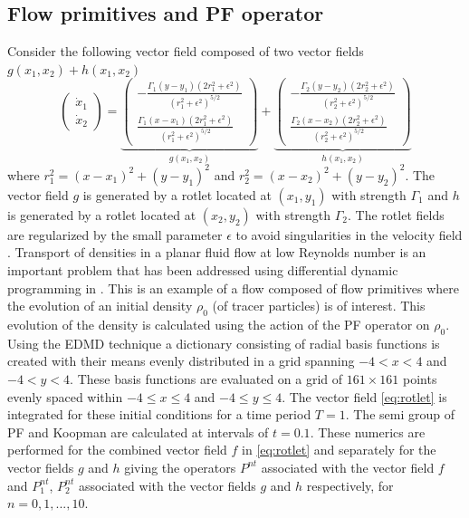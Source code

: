 \documentclass[pdflatex,sn-mathphys]{sn-jnl}%
\theoremstyle{thmstyleone}%
\theoremstyle{thmstyletwo}%
\theoremstyle{thmstylethree}%
\begin{document}
\subsection{Flow primitives and PF operator} \label{sec:rotlet}
Consider the following vector field composed of two vector fields $g(x_1,x_2) + h(x_1,x_2)$
\begin{equation}\label{eq:rotlet}
\begin{pmatrix}
    \dot{x}_1 \\
    \dot{x}_2
\end{pmatrix} 
= \underbrace{\begin{pmatrix}
- \frac{\Gamma_1 (y-y_1)(2r_1^2 + \epsilon^2)}{(r_1^2 + \epsilon^2)^{5/2}}\\
  \frac{\Gamma_1 (x-x_1)(2r_1^2 + \epsilon^2)}{(r_1^2 + \epsilon^2)^{5/2}}
\end{pmatrix}}_{g(x_1,x_2)} + 
\underbrace{\begin{pmatrix}
- \frac{\Gamma_2 (y-y_2)(2r_2^2 + \epsilon^2)}{(r_2^2 + \epsilon^2)^{5/2}}\\
  \frac{\Gamma_2 (x-x_2)(2r_2^2 + \epsilon^2)}{(r_2^2 + \epsilon^2)^{5/2}}
\end{pmatrix}}_{h(x_1,x_2)}
\end{equation}
where $r_1^2 = (x-x_1)^2+(y-y_1)^2$ and $r_2^2 = (x-x_2)^2+(y-y_2)^2$.
The vector field $g$ is generated by a rotlet located at $(x_1,y_1)$ with strength $\Gamma_1$ and $h$ is generated by a rotlet located at $(x_2,y_2)$ with strength $\Gamma_2$. The rotlet fields are regularized by the small parameter $\epsilon$ to avoid singularities in the velocity field \cite{ainley_jcp_2008, cortez_jcp_2015}. Transport of densities in a planar fluid flow at low Reynolds number is an important problem that has been addressed using differential dynamic programming in \cite{bt_cdc_2023, bt_pof_2024, bt_physicad_2025}. This is an example of a flow composed of flow primitives where the evolution of an initial density $\rho_0$ (of tracer particles) is of interest. This evolution of the density is calculated using the action of the PF operator on $\rho_0$. Using the EDMD technique a dictionary consisting of  radial basis functions is created with their means evenly distributed in a grid spanning $-4<x<4$ and $-4<y<4$. These basis functions are evaluated on a grid of $161\times161$ points evenly spaced within $-4\leq x \leq 4$ and $-4\leq y \leq 4$. The vector field \eqref{eq:rotlet} is integrated for these initial conditions for a time period $T=1$. The semi group of PF and Koopman are calculated at intervals of $t=0.1$. These numerics are performed for the combined vector field $f$ in \eqref{eq:rotlet} and separately for the vector fields $g$ and $h$ giving the operators $P^{nt}$ associated with the vector field $f$ and $P_1^{nt}$, $P_2^{nt}$ associated with the vector fields $g$ and $h$ respectively, for $n = 0, 1, ..., 10$.
\end{document}
